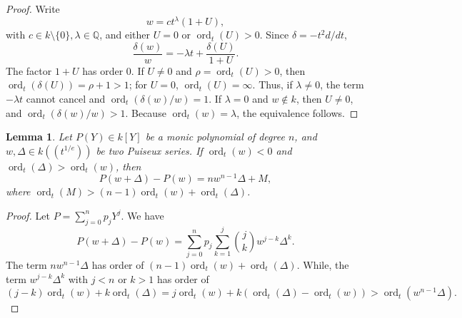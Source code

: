 \documentclass{article}
\newtheorem{lemma}[theorem]{Lemma}
\DeclareMathOperator{\ord}{ord}
\newcommand{\Q}{\mathbb Q}
\newcommand{\dd}{\delta}
\newcommand{\Dt}{\Delta}
\begin{document}
\begin{proof}
Write
\[
  w=ct^\lambda(1+U),
\]
with $c\in k\setminus \{0\}, \lambda\in\Q$, and either $U=0$ or
$\ord_t(U)>0$.  Since \(\dd=-t^2d/dt\),
\[
  \frac{\dd (w)}{w}
  =
  -\lambda t+\frac{\dd (U)}{1+U}.
\]
The factor $1+U$ has order $0$.  If $U\neq 0$ and
$\rho=\ord_t(U)>0$, then 
$\ord_t(\dd (U))=\rho+1>1$; for $U=0$, $\ord_t(U)=\infty$.  Thus, if 
$\lambda\neq 0$, the term $-\lambda t$ cannot cancel and
$\ord_t(\dd(w)/w)=1$.  If $\lambda=0$ and $w\notin k$, then
$U\neq 0$, and $\ord_t(\dd(w)/w)>1$.  Because $\ord_t(w)=\lambda$, the
equivalence follows.
\end{proof}

\begin{lemma}
  \label{LM:order-polynomialdifference}
Let $P(Y) \in k[Y]$ be a monic polynomial of degree $n$, and $w, \Dt \in k((t^{1/e}))$ be two Puiseux series. 
If $\ord_t(w) < 0$ and $\ord_t(\Dt) > \ord_t(w)$, then  
$$P(w+\Dt)-P(w) = nw^{n-1}\Dt + M,$$
where $\ord_t(M)>(n-1)\ord_t(w)+\ord_t(\Delta)$.
\end{lemma}
\begin{proof}
Let $P = \sum_{j=0}^n p_j Y^j$. We have 
\[
  P(w+\Dt)-P(w)
  =\sum_{j=0}^np_{j}\sum_{k=1}^j\binom jkw^{j-k}\Dt^k.
\]
The term $nw^{n-1}\Dt$ has order of $(n-1)\ord_t(w)+\ord_t(\Delta)$.
While, the term $w^{j-k}\Dt^k$ with $j<n$ or $k>1$ has order of 
$$ 
 (j-k)\ord_t(w) + k\ord_t(\Dt) = j \ord_t(w) + k(\ord_t(\Dt)-\ord_t(w))>\ord_t(w^{n-1}\Dt).
$$  
\end{proof}
\end{document}
